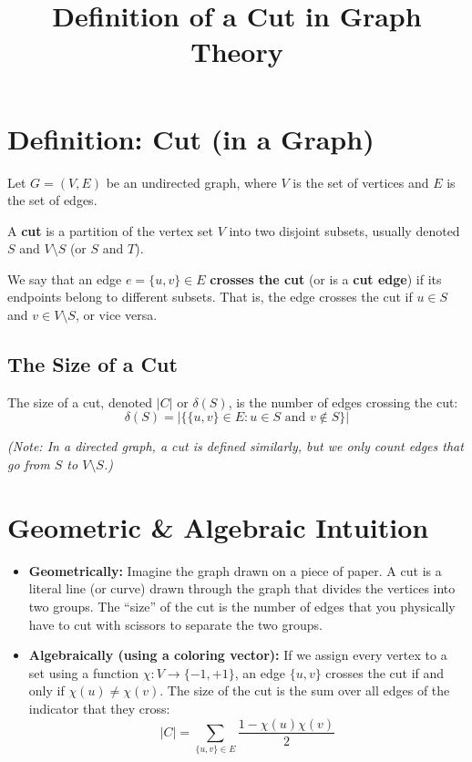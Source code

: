 \documentclass[11pt]{article}
\title{Definition of a Cut in Graph Theory}
\author{}
\date{}
\begin{document}
\maketitle

\section{Definition: Cut (in a Graph)}

Let \(G = (V, E)\) be an undirected graph, where \(V\) is the set of vertices and \(E\) is the set of edges. 

A \textbf{cut} is a partition of the vertex set \(V\) into two disjoint subsets, usually denoted \(S\) and \(V \setminus S\) (or \(S\) and \(T\)). 

We say that an edge \(e = \{u, v\} \in E\) \textbf{crosses the cut} (or is a \textbf{cut edge}) if its endpoints belong to different subsets. That is, the edge crosses the cut if \(u \in S\) and \(v \in V \setminus S\), or vice versa.

\subsection*{The Size of a Cut}
The size of a cut, denoted \(|C|\) or \(\delta(S)\), is the number of edges crossing the cut:
\[
 \delta(S) = |\{ \{u, v\} \in E : u \in S \text{ and } v \notin S \}| 
\]

\emph{(Note: In a directed graph, a cut is defined similarly, but we only count edges that go from \(S\) to \(V \setminus S\).)}

\hrulefill

\section{Geometric \& Algebraic Intuition}

\begin{itemize}
    \item \textbf{Geometrically:} Imagine the graph drawn on a piece of paper. A cut is a literal line (or curve) drawn through the graph that divides the vertices into two groups. The ``size'' of the cut is the number of edges that you physically have to cut with scissors to separate the two groups.
    \item \textbf{Algebraically (using a coloring vector):} If we assign every vertex to a set using a function \(\chi: V \to \{-1, +1\}\), an edge \(\{u,v\}\) crosses the cut if and only if \(\chi(u) \neq \chi(v)\). The size of the cut is the sum over all edges of the indicator that they cross:
    \[
 |C| = \sum_{\{u,v\} \in E} \frac{1 - \chi(u)\chi(v)}{2} 
\]
\end{itemize}
\end{document}
